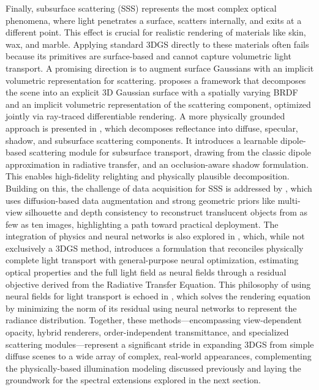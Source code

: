 \documentclass[11pt]{article}
\begin{document}
Finally, subsurface scattering (SSS) represents the most complex optical phenomena, where light penetrates a surface, scatters internally, and exits at a different point. This effect is crucial for realistic rendering of materials like skin, wax, and marble. Applying standard 3DGS directly to these materials often fails because its primitives are surface-based and cannot capture volumetric light transport. A promising direction is to augment surface Gaussians with an implicit volumetric representation for scattering. \cite{ref609} proposes a framework that decomposes the scene into an explicit 3D Gaussian surface with a spatially varying BRDF and an implicit volumetric representation of the scattering component, optimized jointly via ray-traced differentiable rendering. A more physically grounded approach is presented in \cite{ref610}, which decomposes reflectance into diffuse, specular, shadow, and subsurface scattering components. It introduces a learnable dipole-based scattering module for subsurface transport, drawing from the classic dipole approximation in radiative transfer, and an occlusion-aware shadow formulation. This enables high-fidelity relighting and physically plausible decomposition. Building on this, the challenge of data acquisition for SSS is addressed by \cite{ref611}, which uses diffusion-based data augmentation and strong geometric priors like multi-view silhouette and depth consistency to reconstruct translucent objects from as few as ten images, highlighting a path toward practical deployment. The integration of physics and neural networks is also explored in \cite{ref612}, which, while not exclusively a 3DGS method, introduces a formulation that reconciles physically complete light transport with general-purpose neural optimization, estimating optical properties and the full light field as neural fields through a residual objective derived from the Radiative Transfer Equation. This philosophy of using neural fields for light transport is echoed in \cite{ref613}, which solves the rendering equation by minimizing the norm of its residual using neural networks to represent the radiance distribution. Together, these methods---encompassing view-dependent opacity, hybrid renderers, order-independent transmittance, and specialized scattering modules---represent a significant stride in expanding 3DGS from simple diffuse scenes to a wide array of complex, real-world appearances, complementing the physically-based illumination modeling discussed previously and laying the groundwork for the spectral extensions explored in the next section.
\end{document}
